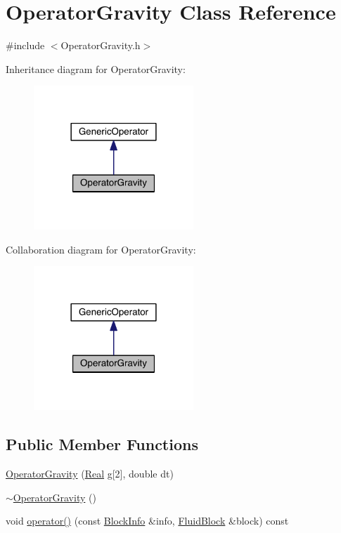 \hypertarget{class_operator_gravity}{}\section{Operator\+Gravity Class Reference}
\label{class_operator_gravity}


{\ttfamily \#include $<$Operator\+Gravity.\+h$>$}



Inheritance diagram for Operator\+Gravity\+:\nopagebreak
\begin{figure}[H]
\begin{center}
\leavevmode
\includegraphics[width=170pt]{d4/d94/class_operator_gravity__inherit__graph}
\end{center}
\end{figure}


Collaboration diagram for Operator\+Gravity\+:\nopagebreak
\begin{figure}[H]
\begin{center}
\leavevmode
\includegraphics[width=170pt]{d9/d64/class_operator_gravity__coll__graph}
\end{center}
\end{figure}
\subsection*{Public Member Functions}
\begin{DoxyCompactItemize}
\item 
\hyperlink{class_operator_gravity_a0c9bdcc6cb80e7f92c52b92f35f9340a}{Operator\+Gravity} (\hyperlink{_h_d_f5_dumper_8h_a445a5f0e2a34c9d97d69a3c2d1957907}{Real} g\mbox{[}2\mbox{]}, double dt)
\item 
\hyperlink{class_operator_gravity_a30a6b4f54bfd10d91064d5e48183038e}{$\sim$\+Operator\+Gravity} ()
\item 
void \hyperlink{class_operator_gravity_a7829a016bf4b27c2213493e363515c90}{operator()} (const \hyperlink{struct_block_info}{Block\+Info} \&info, \hyperlink{struct_fluid_block}{Fluid\+Block} \&block) const 
\end{DoxyCompactItemize}


